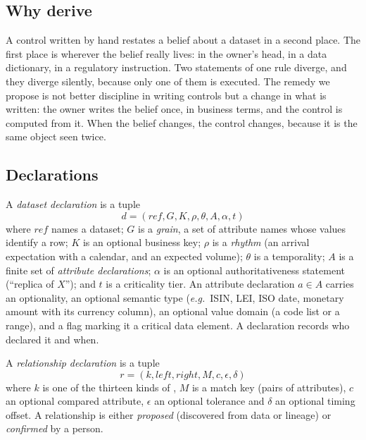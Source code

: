 \documentclass[11pt,a4paper]{article}
\renewcommand{\_}{\oldunderscore\allowbreak}
\theoremstyle{plain}
\theoremstyle{definition}
\theoremstyle{remark}
\newcommand{\eg}{\emph{e.g.}\ }
\newcommand{\defn}[1]{\emph{#1}}
\begin{document}
\subsection{Why derive}

A control written by hand restates a belief about a dataset in a second place. The first place is
wherever the belief really lives: in the owner's head, in a data dictionary, in a regulatory instruction.
Two statements of one rule diverge, and they diverge silently, because only one of them is executed. The
remedy we propose is not better discipline in writing controls but a change in what is written: the owner
writes the belief once, in business terms, and the control is computed from it. When the belief changes,
the control changes, because it is the same object seen twice.

\subsection{Declarations}

\begin{definition}\label{def:decl}
A \defn{dataset declaration} is a tuple
\[ d = (\mathit{ref}, G, K, \rho, \theta, A, \alpha, t) \]
where $\mathit{ref}$ names a dataset; $G$ is a \emph{grain}, a set of attribute names whose values identify a row;
$K$ is an optional business key; $\rho$ is a \emph{rhythm} (an arrival expectation with a calendar, and an
expected volume); $\theta$ is a temporality; $A$ is a finite set of \emph{attribute declarations}; $\alpha$
is an optional authoritativeness statement (``replica of $X$''); and $t$ is a criticality tier. An attribute
declaration $a \in A$ carries an optionality, an optional semantic type (\eg ISIN, LEI, ISO date, monetary
amount with its currency column), an optional value domain (a code list or a range), and a flag marking it
a critical data element. A declaration records who declared it and when.
\end{definition}

\begin{definition}\label{def:rel}
A \defn{relationship declaration} is a tuple
\[ r = (k, \mathit{left}, \mathit{right}, M, c, \epsilon, \delta) \]
where $k$ is one of the thirteen kinds of , $M$ is a match key (pairs of attributes), $c$ an
optional compared attribute, $\epsilon$ an optional tolerance and $\delta$ an optional timing offset.
A relationship is either \emph{proposed} (discovered from data or lineage) or \emph{confirmed} by a person.
\end{definition}
\end{document}

